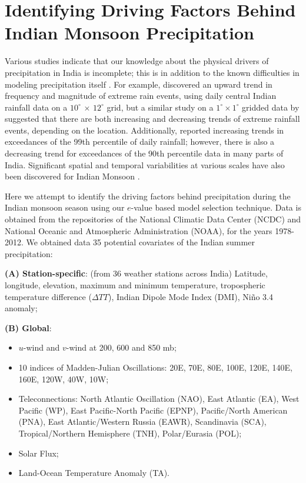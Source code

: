 \section{Identifying Driving Factors Behind Indian Monsoon Precipitation}
\label{Section:IndianMonsoon}
%
Various  studies indicate that our knowledge about the physical drivers of precipitation in India is incomplete; this is in addition to the known difficulties in modeling precipitation itself \citep{KnuttiEtal10, TrenberthEtal03, WangEtal05, Trenberth11}. For example, \cite{Goswami05} discovered an upward trend in frequency and magnitude of extreme rain events, using daily central Indian rainfall data on a $10^{\circ}$ $\times$ $12^{\circ}$ grid, but a similar study on a $1^{\circ}\times 1^{\circ}$ gridded data by \cite{GhoshEtal16} suggested that there are both increasing and decreasing trends of extreme rainfall events, depending on the location. Additionally, \cite{Krishnamurthy09} reported increasing trends in exceedances of the 99th percentile of daily rainfall; however, there is also a decreasing trend for exceedances of the 90th percentile data in many parts of India. Significant spatial and temporal variabilities at various scales have also been discovered for Indian Monsoon \citep{Dietz2014, Dietz2015Chapter}.

Here we attempt to identify the driving factors behind precipitation during the Indian monsoon season using our $e$-value based model selection technique. Data is obtained from the repositories of the National Climatic Data Center (NCDC) and National Oceanic and Atmospheric Administration (NOAA), for the years 1978-2012. 
We obtained data 35 potential covariates of the Indian summer precipitation:

\noindent\textbf{(A) Station-specific}: (from 36 weather stations across India) Latitude, longitude, elevation, maximum and minimum temperature, tropospheric temperature difference ($\Delta TT$), Indian Dipole Mode Index (DMI), Ni\~{n}o 3.4 anomaly;

\noindent\textbf{(B) Global}:
\begin{itemize}
\item $u$-wind and $v$-wind at 200, 600 and 850 mb;

\item 10 indices of Madden-Julian Oscillations: 20E, 70E, 80E, 100E, 120E, 140E, 160E, 120W, 40W, 10W;

\item Teleconnections: North Atlantic Oscillation (NAO), East Atlantic (EA), West Pacific (WP), East Pacific-North Pacific (EPNP), Pacific/North American (PNA), East Atlantic/Western Russia (EAWR), Scandinavia (SCA), Tropical/Northern Hemisphere (TNH), Polar/Eurasia (POL);

\item Solar Flux;

\item Land-Ocean Temperature Anomaly (TA).
\end{itemize}

